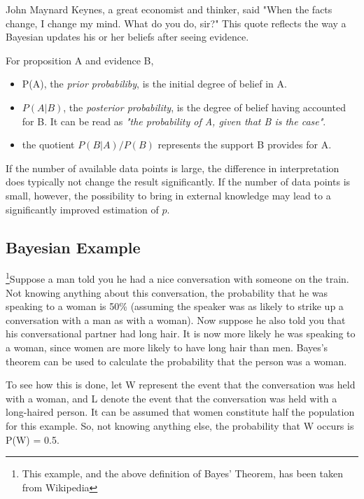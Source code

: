 John Maynard Keynes, a great economist and thinker, said "When the facts change, I change my mind. What do you do, sir?" This quote reflects the way a Bayesian updates his or her beliefs after seeing evidence.

For proposition A and evidence B,

\begin{itemize}
  \item P(A), the \emph{prior probabiliby}, is the initial degree of belief in A.
  \item $P(A|B)$, the \emph{posterior probability}, is the degree of belief having accounted for B. It can be read as \emph{"the probability of A, given that B is the case"}.
  \item the quotient $P(B|A)/P(B)$ represents the support B provides for A.
\end{itemize}

If the number of available data points is large, the difference in interpretation does typically not change the result significantly. If the number of data points is small, however, the possibility to bring in external knowledge may lead to a significantly improved estimation of $p$.

\subsection{Bayesian Example}

\footnote{This example, and the above definition of Bayes' Theorem, has been taken from Wikipedia}Suppose a man told you he had a nice conversation with someone on the train. Not knowing anything about this conversation, the probability that he was speaking to a woman is 50\% (assuming the speaker was as likely to strike up a conversation with a man as with a woman). Now suppose he also told you that his conversational partner had long hair. It is now more likely he was speaking to a woman, since women are more likely to have long hair than men. Bayes's theorem can be used to calculate the probability that the person was a woman.

To see how this is done, let W represent the event that the conversation was held with a woman, and L denote the event that the conversation was held with a long-haired person. It can be assumed that women constitute half the population for this example. So, not knowing anything else, the probability that W occurs is P(W) = 0.5.

